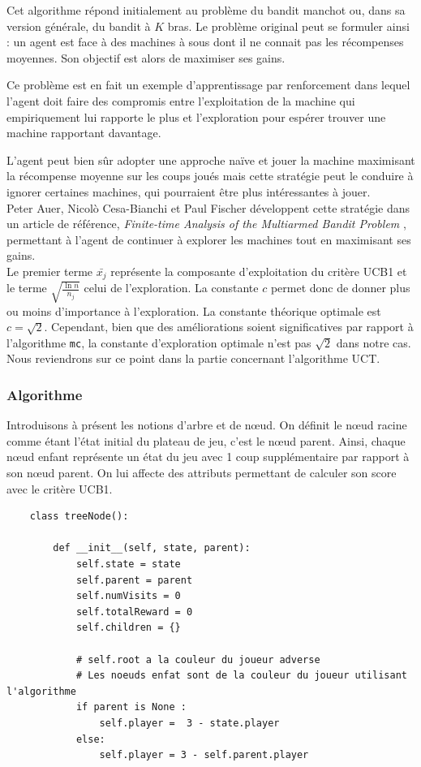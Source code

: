 \documentclass[a4paper]{article}
\theoremstyle{definition}
\begin{document}
Cet algorithme répond initialement au problème du bandit manchot ou, dans sa version générale, du bandit à $K$ bras. Le problème original peut se formuler ainsi : un agent est face à des machines à sous dont il ne connait pas les récompenses moyennes. Son objectif est alors de maximiser ses gains.

Ce problème est en fait un exemple d'apprentissage par renforcement dans lequel l'agent doit faire des compromis entre l'exploitation de la machine qui empiriquement lui rapporte le plus et l'exploration pour espérer trouver une machine rapportant davantage.

L'agent peut bien sûr adopter une approche naïve et jouer la machine maximisant la récompense moyenne sur les coups joués mais  cette stratégie peut le conduire à ignorer certaines machines, qui pourraient être plus intéressantes à jouer. \\

Peter Auer, Nicol\`o Cesa-Bianchi et Paul Fischer développent cette stratégie dans un article de référence, \textit{Finite-time Analysis of the Multiarmed Bandit Problem} \cite{ref1}, permettant à l'agent de continuer à explorer les machines tout en maximisant ses gains.\\

Le premier terme $\bar{x_j}$ représente la composante d'exploitation du critère UCB1 et le terme $\sqrt{\frac{\ln{n}}{n_j} }$ celui de l'exploration. La constante $c$ permet donc de donner plus ou moins d'importance à l'exploration. La constante théorique optimale est $c=\sqrt{2}$. Cependant, bien que des améliorations soient significatives par rapport à l'algorithme \texttt{mc}, la constante d'exploration optimale n'est pas $\sqrt{2}$ dans notre cas. Nous reviendrons sur ce point dans la partie concernant l'algorithme UCT. \\

\newpage

\subsubsection{Algorithme}

Introduisons à présent les notions d'arbre et de nœud. On définit le nœud racine comme étant l'état initial du plateau de jeu, c'est le nœud parent. Ainsi, chaque nœud enfant représente un état du jeu avec 1 coup supplémentaire par rapport à son nœud parent. On lui affecte des attributs permettant de calculer son score avec le critère UCB1.

\begin{lstlisting}
	class treeNode():
	
		def __init__(self, state, parent):
			self.state = state
			self.parent = parent
			self.numVisits = 0
			self.totalReward = 0
			self.children = {}
			
			# self.root a la couleur du joueur adverse 
			# Les noeuds enfat sont de la couleur du joueur utilisant l'algorithme
			if parent is None : 
				self.player =  3 - state.player
			else:
				self.player = 3 - self.parent.player
\end{lstlisting}
\end{document}
